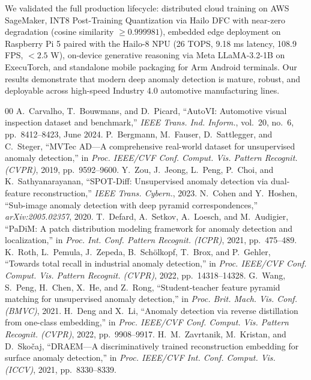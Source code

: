 \documentclass[journal,twocolumn]{IEEEtran}
\begin{document}
We validated the full production lifecycle: distributed cloud training on AWS SageMaker, INT8 Post-Training Quantization via Hailo DFC with near-zero degradation (cosine similarity $\ge 0.999981$), embedded edge deployment on Raspberry Pi 5 paired with the Hailo-8 NPU (26 TOPS, 9.18 ms latency, 108.9 FPS, $<2.5$ W), on-device generative reasoning via Meta LLaMA-3.2-1B on ExecuTorch, and standalone mobile packaging for Arm Android terminals. Our results demonstrate that modern deep anomaly detection is mature, robust, and deployable across high-speed Industry 4.0 automotive manufacturing lines.

\begin{thebibliography}{00}
 A.~Carvalho, T.~Bouwmans, and D.~Picard, ``AutoVI: Automotive visual inspection dataset and benchmark,'' \textit{IEEE Trans. Ind. Inform.}, vol.~20, no.~6, pp.~8412--8423, June 2024.
 P.~Bergmann, M.~Fauser, D.~Sattlegger, and C.~Steger, ``MVTec AD---A comprehensive real-world dataset for unsupervised anomaly detection,'' in \textit{Proc. IEEE/CVF Conf. Comput. Vis. Pattern Recognit. (CVPR)}, 2019, pp.~9592--9600.
 Y.~Zou, J.~Jeong, L.~Peng, P.~Choi, and K.~Sathyanarayanan, ``SPOT-Diff: Unsupervised anomaly detection via dual-feature reconstruction,'' \textit{IEEE Trans. Cybern.}, 2023.
 N.~Cohen and Y.~Hoshen, ``Sub-image anomaly detection with deep pyramid correspondences,'' \textit{arXiv:2005.02357}, 2020.
 T.~Defard, A.~Setkov, A.~Loesch, and M.~Audigier, ``PaDiM: A patch distribution modeling framework for anomaly detection and localization,'' in \textit{Proc. Int. Conf. Pattern Recognit. (ICPR)}, 2021, pp.~475--489.
 K.~Roth, L.~Pemula, J.~Zepeda, B.~Sch{\"o}lkopf, T.~Brox, and P.~Gehler, ``Towards total recall in industrial anomaly detection,'' in \textit{Proc. IEEE/CVF Conf. Comput. Vis. Pattern Recognit. (CVPR)}, 2022, pp.~14318--14328.
 G.~Wang, S.~Peng, H.~Chen, X.~He, and Z.~Rong, ``Student-teacher feature pyramid matching for unsupervised anomaly detection,'' in \textit{Proc. Brit. Mach. Vis. Conf. (BMVC)}, 2021.
 H.~Deng and X.~Li, ``Anomaly detection via reverse distillation from one-class embedding,'' in \textit{Proc. IEEE/CVF Conf. Comput. Vis. Pattern Recognit. (CVPR)}, 2022, pp.~9908--9917.
 H.~M.~Zavrtanik, M.~Kristan, and D.~Sko{\v{c}}aj, ``DRAEM---A discriminatively trained reconstruction embedding for surface anomaly detection,'' in \textit{Proc. IEEE/CVF Int. Conf. Comput. Vis. (ICCV)}, 2021, pp.~8330--8339.

\end{thebibliography}
\end{document}
